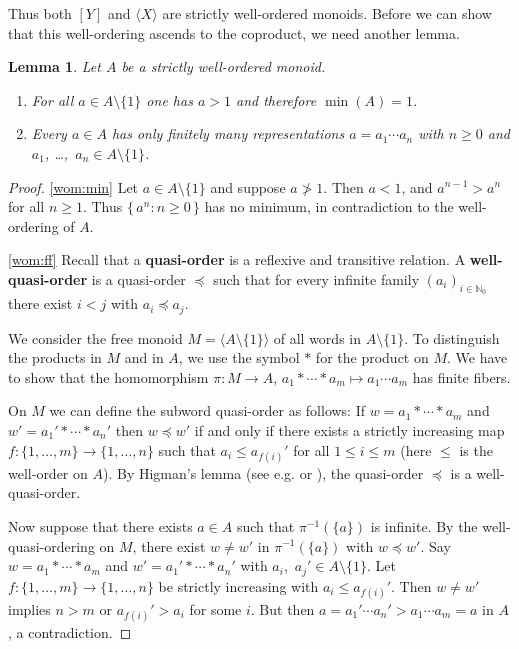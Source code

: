 \documentclass{amsart}
\theoremstyle{plain}
\newtheorem{lemma}[thm]{Lemma}
\theoremstyle{definition}
\newcommand{\defit}[1]{\textbf{#1}}
\newcommand{\bN}{\mathbb N}
\begin{document}
Thus both $[Y]$ and $\langle X \rangle$ are strictly well-ordered monoids.
Before we can show that this well-ordering ascends to the coproduct, we need another lemma.

\begin{lemma} \label{l:wom}
  Let $A$ be a strictly well-ordered monoid.
  \begin{enumerate}
    \item\label{wom:min} For all $a \in A \setminus \{1\}$ one has $a > 1$ and therefore $\min(A)=1$.
    \item\label{wom:ff} Every $a \in A$ has only finitely many representations $a=a_1 \cdots a_n$ with $n \ge 0$ and $a_1$, \dots,~$a_n \in A \setminus \{1\}$.
  \end{enumerate}
\end{lemma}

\begin{proof}
  \ref{wom:min} Let $a \in A \setminus \{1\}$ and suppose $a \not> 1$.
   Then $a < 1$, and $a^{n-1} > a^n$ for all $n \ge 1$.
   Thus $\{\, a^n : n \ge 0 \,\}$ has no minimum, in contradiction to the well-ordering of $A$.

  \ref{wom:ff}
  Recall that a \defit{quasi-order} is a reflexive and transitive relation.
  A \defit{well-quasi-order} is a quasi-order $\preccurlyeq$ such that for every infinite family $(a_i)_{i \in \bN_0}$ there exist $i < j$ with $a_i \preccurlyeq a_j$.

  We consider the free monoid $M = \langle A\setminus\{1\} \rangle$ of all words in $A\setminus \{1\}$.
  To distinguish the products in $M$ and in $A$, we use the symbol $*$ for the product on $M$.
  We have to show that the homomorphism $\pi\colon M \to A$, $a_1 * \cdots * a_m \mapsto a_1 \cdots a_m$ has finite fibers.

  On $M$ we can define the subword quasi-order as follows:
  If $w=a_1 *\cdots *a_m$ and $w'=a_1'* \cdots *a_n'$ then $w \preccurlyeq w'$ if and only if there exists a strictly increasing map $f \colon \{1,\dots,m\} \to \{1,\dots,n\}$ such that $a_i \le a_{f(i)}'$ for all $1 \le i \le m$ (here $\le$ is the well-order on $A$).
  By Higman's lemma (see e.g. \cite[Theorem 4.3]{higman52} or \cite[Theorem 1.6]{milner85}), the quasi-order $\preccurlyeq$ is a well-quasi-order.

  Now suppose that there exists $a \in A$ such that $\pi^{-1}(\{a\})$ is infinite.
  By the well-quasi-ordering on $M$, there exist $w \ne w'$ in $\pi^{-1}(\{a\})$ with $w \preccurlyeq w'$.
  Say $w=a_1 *\cdots *a_m$ and $w'=a_1'* \cdots *a_n'$ with $a_i$,~$a_j' \in A \setminus \{1\}$.
  Let $f\colon \{1,\dots, m\} \to \{1,\dots,n\}$ be strictly increasing with $a_i \le a_{f(i)}'$.
  Then $w \ne w'$ implies $n > m$ or $a_{f(i)}' > a_{i}$ for some $i$.
  But then $a = a_1' \cdots a_n' > a_1 \cdots a_m=a$ in $A$, a contradiction.
\end{proof}
\end{document}
